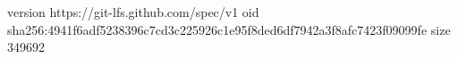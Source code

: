 version https://git-lfs.github.com/spec/v1
oid sha256:4941f6adf5238396c7cd3c225926c1e95f8ded6df7942a3f8afc7423f09099fe
size 349692
